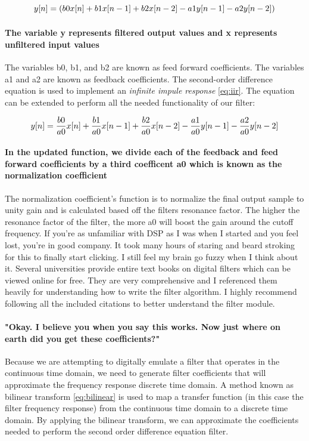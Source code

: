 \documentclass[acmlarge,screen]{acmart}
\begin{document}
	\begin{equation}
		\large
		y[n] = (b0x[n] + b1x[n-1] + b2x[n-2] - a1y[n-1] - a2y[n-2])
		\label{eq:difference}
	\end{equation}

	\paragraph{The variable y represents filtered output values and x represents unfiltered input values} The variables b0, b1, and b2 are known as feed forward coefficients. The variables a1 and a2 are known as feedback coefficients. The second-order difference equation is used to implement an \textit{infinite impule response} \eqref{eq:iir}. The equation can be extended to perform all the needed functionality of our filter:
	
	\begin{equation}
		\large
		y[n] = \frac{b0}{a0}x[n] + \frac{b1}{a0}x[n-1] + \frac{b2}{a0}x[n-2] - \frac{a1}{a0}y[n-1] - \frac{a2}{a0}y[n-2]
		\label{eq:iir}
	\end{equation}
	
	\paragraph{In the updated function, we divide each of the feedback and feed forward coefficients by a third coefficent a0 which is known as the normalization coefficient} The normalization coefficient's function is to normalize the final output sample to unity gain and is calculated based off the filters resonance factor. The higher the resonance factor of the filter, the more a0 will boost the gain around the cutoff frequency. If you're as unfamiliar with DSP as I was when I started and you feel lost, you're in good company. It took many hours of staring and beard stroking for this to finally start clicking. I still feel my brain go fuzzy when I think about it. Several universities provide entire text books on digital filters which can be viewed online for free. They are very comprehensive and I referenced them heavily for understanding how to write the filter algorithm. I highly recommend following all the included citations to better understand the filter module. \cite{lacamera_2020}
	
	\paragraph{"Okay. I believe you when you say this works. Now just where on earth did you get these coefficients?"} Because we are attempting to digitally emulate a filter that operates in the continuous time domain, we need to generate filter coefficients that will approximate the frequency response discrete time domain. A method known as bilinear transform \eqref{eq:bilinear} is used to map a transfer function (in this case the filter frequency response) from the continuous time domain to a discrete time domain. By applying the bilinear transform, we can approximate the coefficients needed to perform the second order difference equation filter.\cite{stanford_2007}
	
\end{document}
